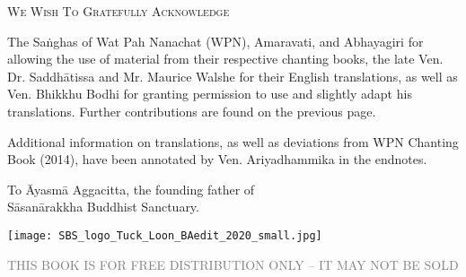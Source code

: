 \cleartorecto
\thispagestyle{empty}

{\setlength{\parskip}{10pt}

{\centering\fontsize{16}{25}\selectfont
\textsc{We Wish To Gratefully Acknowledge}
\par}

The Saṅghas of Wat Pah Nanachat (WPN), Amaravati, and Abhayagiri for allowing the use of material from their respective chanting books, the late Ven. Dr. Saddhātissa and Mr. Maurice Walshe for their English translations, as well as Ven. Bhikkhu Bodhi for granting permission to use and slightly adapt his translations. Further contributions are found on the previous page.


Additional information on translations, as well as deviations
from WPN Chanting Book (2014), have been annotated by Ven. Ariyadhammika in the endnotes.

\medskip

{\centering
To Āyasmā Aggacitta, the founding father of\\
Sāsanārakkha Buddhist Sanctuary.

\medskip

\texttt{[image: SBS\_logo\_Tuck\_Loon\_BAedit\_2020\_small.jpg]}

{\centering\fontsize{10}{30}\selectfont
  \textsc{\textcolor{gray}{THIS BOOK IS FOR FREE DISTRIBUTION ONLY – IT MAY NOT BE SOLD}}
\par}

}

}
